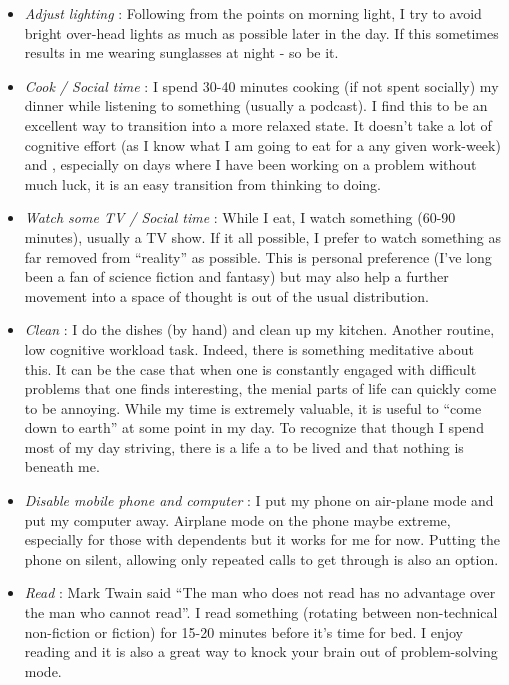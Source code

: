 \documentclass[10pt,twocolumn]{extarticle}
\begin{document}
\begin{itemize}
    \item \textit{Adjust lighting} : Following from the points on morning light, I try to avoid bright over-head lights as much as possible later in the day. If this sometimes results in me wearing sunglasses at night - so be it.
    \item \textit{Cook / Social time} : I spend 30-40 minutes cooking (if not spent socially) my dinner while listening to something (usually a podcast). I find this to be an excellent way to transition into a more relaxed state. It doesn't take a lot of cognitive effort (as I know what I am going to eat for a any given work-week) and , especially on days where I have been working on a problem without much luck, it is an easy transition from thinking to doing.
    \item \textit{Watch some TV / Social time} : While I eat, I watch something (60-90 minutes), usually a TV show. If it all possible, I prefer to watch something as far removed from  ``reality'' as possible. This is personal preference (I've long been a fan of science fiction and fantasy) but may also help a further movement into a space of thought is out of the usual distribution. 
    \item \textit{Clean} : I do the dishes (by hand) and clean up my kitchen. Another routine, low cognitive workload task. Indeed, there is something meditative about this. It can be the case that when one is constantly engaged with difficult problems that one finds interesting, the menial parts of life can quickly come to be annoying. While my time is extremely valuable, it is useful to ``come down to earth'' at some point in my day. To recognize that though I spend most of my day striving, there is a life a to be lived and that nothing is beneath me. 
    \item \textit{Disable mobile phone and computer} : I put my phone on air-plane mode and put my computer away. Airplane mode on the phone maybe extreme, especially for those with dependents but it works for me for now. Putting the phone on silent, allowing only repeated calls to get through is also an option.
    \item \textit{Read} : Mark Twain said ``The man who does not read has no advantage over the man who cannot read''. I read something (rotating between non-technical non-fiction or fiction) for 15-20 minutes before it's time for bed. I enjoy reading and it is also a great way to knock your brain out of problem-solving mode.
\end{itemize}
\end{document}
